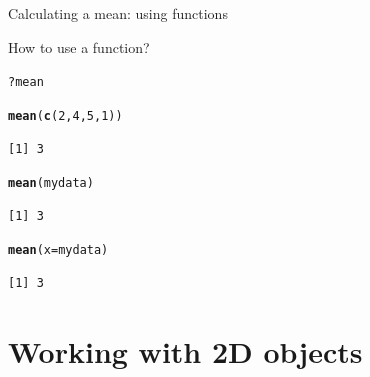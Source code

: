 \documentclass[10pt]{beamer}\usepackage[]{graphicx}\usepackage[]{color}
\makeatletter
\newcommand{\hlnum}[1]{\textcolor[rgb]{0.686,0.059,0.569}{#1}}%
\newcommand{\hlopt}[1]{\textcolor[rgb]{0,0,0}{#1}}%
\newcommand{\hlstd}[1]{\textcolor[rgb]{0.345,0.345,0.345}{#1}}%
\newcommand{\hlkwc}[1]{\textcolor[rgb]{0.333,0.667,0.333}{#1}}%
\newcommand{\hlkwd}[1]{\textcolor[rgb]{0.737,0.353,0.396}{\textbf{#1}}}%
\newenvironment{kframe}{%
 \def\at@end@of@kframe{}%
 \ifinner\ifhmode%
  \def\at@end@of@kframe{\end{minipage}}%
  \begin{minipage}{\columnwidth}%
 \fi\fi%
 \def\FrameCommand##1{\hskip\@totalleftmargin \hskip-\fboxsep
 \colorbox{shadecolor}{##1}\hskip-\fboxsep
     \hskip-\linewidth \hskip-\@totalleftmargin \hskip\columnwidth}%
 \MakeFramed {\advance\hsize-\width
   \@totalleftmargin\z@ \linewidth\hsize
   \@setminipage}}%
 {\par\unskip\endMakeFramed%
 \at@end@of@kframe}
\newenvironment{knitrout}{}{} %
\makeatother
\begin{document}
\begin{frame}[fragile]{Calculating a mean: using functions}%
  
  How to use a function?
\begin{knitrout}
\color{fgcolor}\begin{kframe}
\begin{alltt}
  \hlopt{?}\hlstd{mean}
\end{alltt}
\end{kframe}
\end{knitrout}
  
\pause

\begin{knitrout}
\color{fgcolor}\begin{kframe}
\begin{alltt}
\hlkwd{mean}\hlstd{(}\hlkwd{c}\hlstd{(}\hlnum{2}\hlstd{,}\hlnum{4}\hlstd{,}\hlnum{5}\hlstd{,}\hlnum{1}\hlstd{))}
\end{alltt}
\begin{verbatim}
[1] 3
\end{verbatim}
\begin{alltt}
\hlkwd{mean}\hlstd{(mydata)}
\end{alltt}
\begin{verbatim}
[1] 3
\end{verbatim}
\begin{alltt}
\hlkwd{mean}\hlstd{(}\hlkwc{x} \hlstd{= mydata)}
\end{alltt}
\begin{verbatim}
[1] 3
\end{verbatim}
\end{kframe}
\end{knitrout}
  

\end{frame}

\section{Working with 2D objects}
\end{document}
